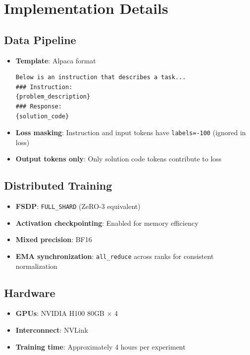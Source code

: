 \section{Implementation Details}
\label{app:impl}

\subsection{Data Pipeline}

\begin{itemize}[nosep]
    \item \textbf{Template}: Alpaca format
    \begin{verbatim}
Below is an instruction that describes a task...
### Instruction:
{problem_description}
### Response:
{solution_code}
    \end{verbatim}

    \item \textbf{Loss masking}: Instruction and input tokens have \texttt{labels=-100} (ignored in loss)
    \item \textbf{Output tokens only}: Only solution code tokens contribute to loss
\end{itemize}

\subsection{Distributed Training}

\begin{itemize}[nosep]
    \item \textbf{FSDP}: \texttt{FULL\_SHARD} (ZeRO-3 equivalent)
    \item \textbf{Activation checkpointing}: Enabled for memory efficiency
    \item \textbf{Mixed precision}: BF16
    \item \textbf{EMA synchronization}: \texttt{all\_reduce} across ranks for consistent normalization
\end{itemize}

\subsection{Hardware}

\begin{itemize}[nosep]
    \item \textbf{GPUs}: NVIDIA H100 80GB $\times$ 4
    \item \textbf{Interconnect}: NVLink
    \item \textbf{Training time}: Approximately 4 hours per experiment
\end{itemize}

